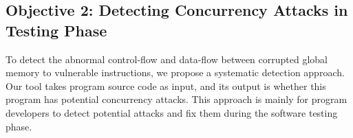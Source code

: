 






\vspace{-.15in}\subsection{Objective 2: Detecting Concurrency Attacks in 
Testing Phase}\label{sec:detect}\vspace{-.075in}

To detect the abnormal control-flow and data-flow between corrupted global 
memory to vulnerable instructions, we propose a systematic detection approach. 
Our tool takes program source code as input, and its output is whether this 
program has potential concurrency attacks. This approach is mainly for program 
developers to detect potential attacks and fix them during the software testing 
phase.

